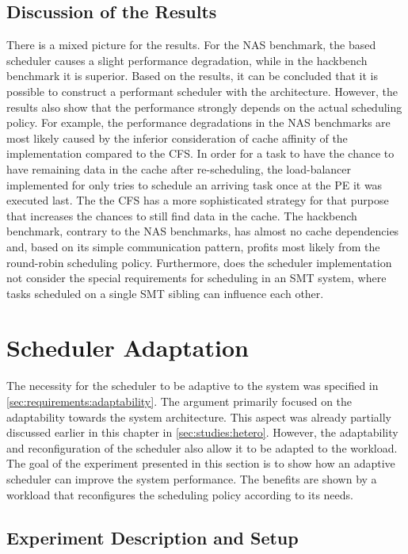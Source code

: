 \subsection{Discussion of the Results}

There is a mixed picture for the results. For the \ac{NAS} benchmark, the \cobas{} based scheduler causes a slight performance degradation, while in the hackbench benchmark it is superior. Based on the results, it can be concluded that it is possible to construct a performant scheduler with the \cobas{} architecture. However, the results also show that the performance strongly depends on the actual scheduling policy. For example, the performance degradations in the \ac{NAS} benchmarks are most likely caused by the inferior consideration of cache affinity of the \cobas{} implementation compared to the \ac{CFS}. In order for a task to have the chance to have remaining data in the cache after re-scheduling, the load-balancer implemented for \cobas{} only tries to schedule an arriving task once at the \ac{PE} it was executed last. The the \ac{CFS} has a more sophisticated strategy for that purpose that increases the chances to still find data in the cache. The hackbench benchmark, contrary to the \ac{NAS} benchmarks, has almost no cache dependencies and, based on its simple communication pattern, profits most likely from the round-robin scheduling policy. Furthermore, does the \cobas{} scheduler implementation not consider the special requirements for scheduling in an \ac{SMT} system, where tasks scheduled on a single \ac{SMT} sibling can influence each other.

\section{Scheduler Adaptation}%
\label{sec:studies:performance}

The necessity for the scheduler to be adaptive to the system was specified in \cref{sec:requirements:adaptability}. The argument primarily focused on the adaptability towards the system architecture. This aspect was already partially discussed earlier in this chapter in \cref{sec:studies:hetero}. However, the adaptability and reconfiguration of the scheduler also allow it to be adapted to the workload. The goal of the experiment presented in this section is to show how an adaptive scheduler can improve the system performance. The benefits are shown by a workload that reconfigures the scheduling policy according to its needs.

\subsection{Experiment Description and Setup}

